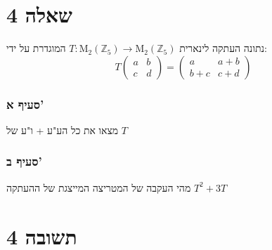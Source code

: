 \documentclass[12pt, titlepage]{article}
\begin{document}
\part*{שאלה 4}
נתונה העתקה לינארית $T:\mathrm{M}_2\left(\mathbb{Z}_5\right) \to \mathrm{M}_2\left(\mathbb{Z}_5\right)$ המוגדרת על ידי:
\[
    T\begin{pmatrix}
        a&b\\c&d
    \end{pmatrix}=\begin{pmatrix}
        a&a+b\\b+c&c+d
    \end{pmatrix}
\]
\section*{סעיף א'}
מצאו את כל הע"ע + ו"ע של $T$
\section*{סעיף ב'}
מהי העקבה של המטריצה המייצגת של ההעתקה $T^2+3T$
\newpage
\part*{תשובה 4}
\end{document}
